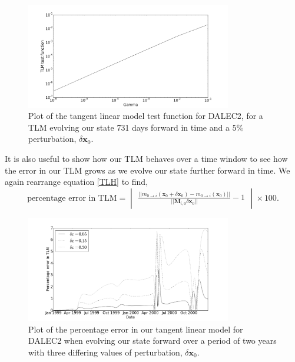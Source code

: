 \documentclass[11pt]{article}
\begin{document}
\begin{figure}[ht]
    \centering
    \includegraphics[width=0.8\textwidth]{testtlmer.png}
    \caption{Plot of the tangent linear model test function for DALEC2, for a TLM evolving our state 731 days forward in time and a $5\%$ perturbation, $\delta \textbf{x}_0$.}
    \label{fig:tlm}
\end{figure}

It is also useful to show how our TLM behaves over a time window to see how the error in our TLM grows as we evolve our state further forward in time. We again rearrange equation \ref{TLH} to find, 
\begin{equation}
\text{percentage error in TLM} = \begin{vmatrix} \frac{||m_{0\rightarrow i}(\mathbf{x}_0+\delta\mathbf{x}_0) - m_{0 \rightarrow i}(\mathbf{x}_0)||}{|| \mathbf{M}_{i,0}\delta\mathbf{x}_0||} - 1 \end{vmatrix} \times 100.
\end{equation}

\begin{figure}[ht]
    \centering
    \includegraphics[width=0.8\textwidth]{tlm_error.png}
    \caption{Plot of the percentage error in our tangent linear model for DALEC2 when evolving our state forward over a period of two years with three differing values of perturbation, $\delta \textbf{x}_0$.}
    \label{fig:tlm_error}
\end{figure}
\end{document}
